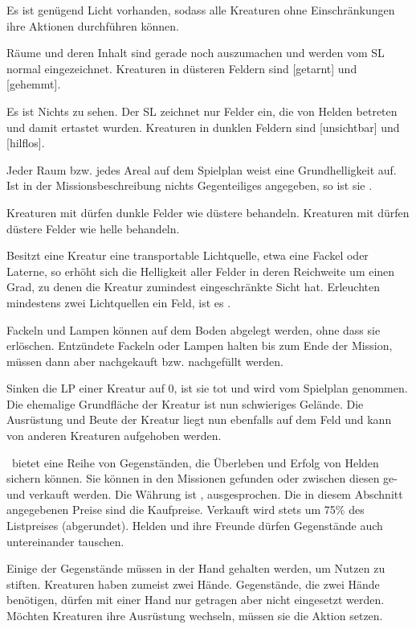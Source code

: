 {		 Es ist genügend Licht vorhanden, sodass alle Kreaturen ohne Einschränkungen ihre Aktionen durchführen können.

		 Räume und deren Inhalt sind gerade noch auszumachen und werden vom SL normal eingezeichnet. Kreaturen in düsteren Feldern sind [getarnt] und [gehemmt].

		 Es ist Nichts zu sehen. Der SL zeichnet nur Felder ein, die von Helden betreten und damit ertastet wurden. Kreaturen in dunklen Feldern sind [unsichtbar] und [hilflos].

		Jeder Raum bzw. jedes Areal auf dem Spielplan weist eine Grundhelligkeit auf. Ist in der Missionsbeschreibung nichts Gegenteiliges angegeben, so ist sie .

		Kreaturen mit  dürfen dunkle Felder wie düstere behandeln. Kreaturen mit  dürfen düstere Felder wie helle behandeln.

			Besitzt eine Kreatur eine transportable Lichtquelle, etwa eine Fackel oder Laterne, so erhöht sich die Helligkeit aller Felder in deren Reichweite um einen Grad, zu denen die Kreatur zumindest eingeschränkte Sicht hat. Erleuchten mindestens zwei Lichtquellen ein Feld, ist es .

			Fackeln und Lampen können auf dem Boden abgelegt werden, ohne dass sie erlöschen. Entzündete Fackeln oder Lampen halten bis zum Ende der Mission, müssen dann aber nachgekauft bzw. nachgefüllt werden.

		Sinken die LP einer Kreatur auf 0, ist sie tot und wird vom Spielplan genommen. Die ehemalige Grundfläche der Kreatur ist nun schwieriges Gelände. Die Ausrüstung und Beute der Kreatur liegt nun ebenfalls auf dem Feld und kann von anderen Kreaturen aufgehoben werden.

		\bmh~bietet eine Reihe von Gegenständen, die Überleben und Erfolg von Helden sichern können. Sie können in den Missionen gefunden oder zwischen diesen ge- und verkauft werden. Die Währung ist ,  ausgesprochen. Die in diesem Abschnitt angegebenen Preise sind die Kaufpreise. Verkauft wird stets um 75\% des Listpreises (abgerundet). Helden und ihre Freunde dürfen Gegenstände auch untereinander tauschen.

		Einige der Gegenstände müssen in der Hand gehalten werden, um Nutzen zu stiften. Kreaturen haben zumeist zwei Hände. Gegenstände, die zwei Hände benötigen, dürfen mit einer Hand nur getragen aber nicht eingesetzt werden. Möchten Kreaturen ihre Ausrüstung wechseln, müssen sie die Aktion  setzen.

}
